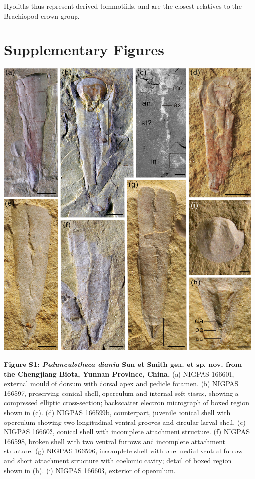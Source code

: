 \documentclass[openany]{book}
\theoremstyle{definition}
\theoremstyle{definition}
\theoremstyle{definition}
\theoremstyle{remark}
\begin{document}
\begin{description}
Hyoliths thus represent derived tommotiids, and are the closest
relatives to the Brachiopod crown group.
\end{description}

\hypertarget{figures}{%
\chapter{Supplementary Figures}\label{figures}}

\newpage

\begin{center}\includegraphics[width=0.8\linewidth]{images/image1} \end{center}

\textbf{Figure S1: \emph{Pedunculotheca diania} Sun et Smith gen. et sp.
nov. from the Chengjiang Biota, Yunnan Province, China.} (a) NIGPAS
166601, external mould of dorsum with dorsal apex and pedicle foramen.
(b) NIGPAS 166597, preserving conical shell, operculum and internal soft
tissue, showing a compressed elliptic cross-section; backscatter
electron micrograph of boxed region shown in (c). (d) NIGPAS 166599b,
counterpart, juvenile conical shell with operculum showing two
longitudinal ventral grooves and circular larval shell. (e) NIGPAS
166602, conical shell with incomplete attachment structure. (f) NIGPAS
166598, broken shell with two ventral furrows and incomplete attachment
structure. (g) NIGPAS 166596, incomplete shell with one medial ventral
furrow and short attachment structure with coelomic cavity; detail of
boxed region shown in (h). (i) NIGPAS 166603, exterior of operculum.
\end{document}
